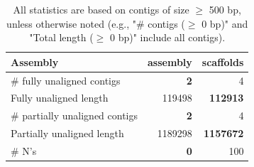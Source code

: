 \documentclass[12pt,a4paper]{article}
\begin{document}
\begin{table}[ht]
\begin{center}
\caption{All statistics are based on contigs of size $\geq$ 500 bp, unless otherwise noted (e.g., "\# contigs ($\geq$ 0 bp)" and "Total length ($\geq$ 0 bp)" include all contigs).}
\begin{tabular}{|l*{2}{|r}|}
\hline
Assembly & assembly & scaffolds \\ \hline
\# fully unaligned contigs & {\bf 2} & 4 \\ \hline
Fully unaligned length & 119498 & {\bf 112913} \\ \hline
\# partially unaligned contigs & {\bf 2} & 4 \\ \hline
Partially unaligned length & 1189298 & {\bf 1157672} \\ \hline
\# N's & {\bf 0} & 100 \\ \hline
\end{tabular}
\end{center}
\end{table}
\end{document}
